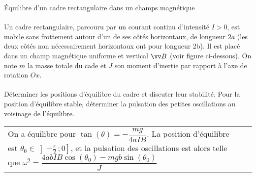 \documentclass[french, a4paper, 11pt]{article}
\newcommand{\interof}[2]{\left]#1\,;#2\right]}   %
\begin{document}
\begin{cadre}{Équilibre d'un cadre rectangulaire dans un champs magnétique}
    \paragraph*{}
    Un cadre rectangulaire, parcouru par un courant continu d'intensité \(I>0\), est mobile sans frottement autour d'un de ses côtés
    horizontaux, de longueur \(2a\) (les deux côtés non nécessairement horizontaux ont pour longueur 2b). Il est placé dans un champ
    magnétique uniforme et vertical \(\vv B\) (voir figure ci-dessous). On note \(m\) la masse totale du cade et \(J\) son moment d'inertie
    par rapport à l'axe de rotation \(Ox\).

    \begin{center}
    \end{center}
    
    \paragraph*{}
    Déterminer les positions d'équilibre du cadre et discuter leur stabilité. Pour la position d'équilibre stable, déterminer
    la pulsation des petites oscillations au voisinage de l'équilibre.

    \tcblower
    \begin{tabularx}{\linewidth}{Xr}
        On a équilibre pour \(\tan(\theta)=-\dfrac{mg}{4aIB}\). La position d'équilibre est \(\theta_0 \in \interof{-\frac{\pi}{2}}{0}\),
        et la pulsation des oscillations est alors telle que \(\omega^2=\dfrac{4abIB\cos(\theta_0)-mgb\sin(\theta_0)}{J}\)
    \end{tabularx}
\end{cadre}
\end{document}
